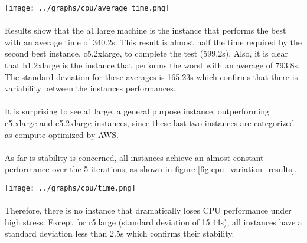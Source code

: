 \documentclass[11pt]{article}
\begin{document}
		\begin{center}
			\begin{minipage}{0.6\textwidth}
				 \label{fig:cpu_average_results}
				\texttt{[image: ../graphs/cpu/average\_time.png]}
			\end{minipage}
		\end{center}

		\paragraph{} Results show that the a1.large machine is the instance that
		performs the best with an average time of 340.2s. This result is almost
		half the time required by the second best instance, c5.2xlarge, to
		complete the test (599.2s). Also, it is clear that h1.2xlarge is the
		instance that performs the worst with an average of 793.8s. The standard
		deviation for these averages is 165.23s which confirms that there is
		variability between the instances performances.

		\paragraph{} It is surprising to see a1.large, a general purpose
		instance, outperforming c5.xlarge and c5.2xlarge instances, since these
		last two instances are categorized as compute optimized by AWS.

		\paragraph{} As far is stability is concerned, all instances achieve an
		almost constant performance over the 5 iterations, as shown in figure \ref{fig:cpu_variation_results}.

		\begin{center}
			\begin{minipage}{0.6\textwidth}
				 \label{fig:cpu_variation_results}
				\texttt{[image: ../graphs/cpu/time.png]}
			\end{minipage}
		\end{center}
		
		\paragraph{} Therefore, there is no instance that dramatically loses CPU
		performance under high stress. Except for r5.large (standard deviation
		of 15.44s), all instances have a standard deviation less than 2.5s which
		confirms their stability.
	
\end{document}
